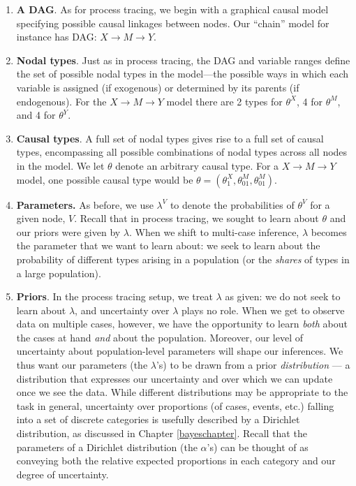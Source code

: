\documentclass[
  12pt,
]{book}
\begin{document}
\begin{enumerate}
\def\labelenumi{\arabic{enumi}.}
\item
  \textbf{A DAG}. As for process tracing, we begin with a graphical causal model specifying possible causal linkages between nodes. Our ``chain'' model for instance has DAG: \(X \rightarrow M \rightarrow Y\).
\item
  \textbf{Nodal types}. Just as in process tracing, the DAG and variable ranges define the set of possible nodal types in the model---the possible ways in which each variable is assigned (if exogenous) or determined by its parents (if endogenous). For the \(X \rightarrow M \rightarrow Y\) model there are 2 types for \(\theta^X\), 4 for \(\theta^M\), and 4 for \(\theta^Y\).
\item
  \textbf{Causal types}. A full set of nodal types gives rise to a full set of causal types, encompassing all possible combinations of nodal types across all nodes in the model. We let \(\theta\) denote an arbitrary causal type. For a \(X \rightarrow M \rightarrow Y\) model, one possible causal type would be \(\theta = (\theta^X_1, \theta^M_{01}, \theta^M_{01})\).
\item
  \textbf{Parameters.} As before, we use \(\lambda^V\) to denote the probabilities of \(\theta^V\) for a given node, \(V\). Recall that in process tracing, we sought to learn about \(\theta\) and our priors were given by \(\lambda\). When we shift to multi-case inference, \(\lambda\) becomes the parameter that we want to learn about: we seek to learn about the probability of different types arising in a population (or the \emph{shares} of types in a large population).
\item
  \textbf{Priors}. In the process tracing setup, we treat \(\lambda\) as given: we do not seek to learn about \(\lambda\), and uncertainty over \(\lambda\) plays no role. When we get to observe data on multiple cases, however, we have the opportunity to learn \emph{both} about the cases at hand \emph{and} about the population. Moreover, our level of uncertainty about population-level parameters will shape our inferences. We thus want our parameters (the \(\lambda\)'s) to be drawn from a prior \emph{distribution} --- a distribution that expresses our uncertainty and over which we can update once we see the data. While different distributions may be appropriate to the task in general, uncertainty over proportions (of cases, events, etc.) falling into a set of discrete categories is usefully described by a Dirichlet distribution, as discussed in Chapter \ref{bayeschapter}. Recall that the parameters of a Dirichlet distribution (the \(\alpha\)'s) can be thought of as conveying both the relative expected proportions in each category and our degree of uncertainty.
\end{enumerate}
\end{document}
